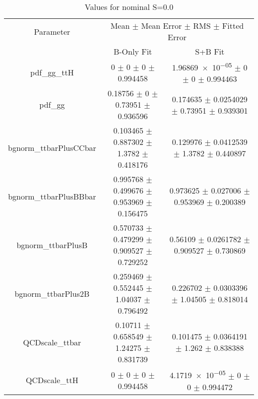 \begin{table}
\centering
\caption{Values for nominal S=0.0}
\begin{tabular}{ccc}
\toprule
Parameter & \multicolumn{2}{c}{Mean $\pm$ Mean Error $\pm$ RMS $\pm$ Fitted Error}\\
 & B-Only Fit & S+B Fit\\
\midrule
pdf\_gg\_ttH & \num{0} $\pm$ \num{0} $\pm$ \num{0} $\pm$ \num{0.994458} & \num{1.96869e-05} $\pm$ \num{0} $\pm$ \num{0} $\pm$ \num{0.994463}\\
pdf\_gg & \num{0.18756} $\pm$ \num{0} $\pm$ \num{0.73951} $\pm$ \num{0.936596} & \num{0.174635} $\pm$ \num{0.0254029} $\pm$ \num{0.73951} $\pm$ \num{0.939301}\\
bgnorm\_ttbarPlusCCbar & \num{0.103465} $\pm$ \num{0.887302} $\pm$ \num{1.3782} $\pm$ \num{0.418176} & \num{0.129976} $\pm$ \num{0.0412539} $\pm$ \num{1.3782} $\pm$ \num{0.440897}\\
bgnorm\_ttbarPlusBBbar & \num{0.995768} $\pm$ \num{0.499676} $\pm$ \num{0.953969} $\pm$ \num{0.156475} & \num{0.973625} $\pm$ \num{0.027006} $\pm$ \num{0.953969} $\pm$ \num{0.200389}\\
bgnorm\_ttbarPlusB & \num{0.570733} $\pm$ \num{0.479299} $\pm$ \num{0.909527} $\pm$ \num{0.729252} & \num{0.56109} $\pm$ \num{0.0261782} $\pm$ \num{0.909527} $\pm$ \num{0.730869}\\
bgnorm\_ttbarPlus2B & \num{0.259469} $\pm$ \num{0.552445} $\pm$ \num{1.04037} $\pm$ \num{0.796492} & \num{0.226702} $\pm$ \num{0.0303396} $\pm$ \num{1.04505} $\pm$ \num{0.818014}\\
QCDscale\_ttbar & \num{0.10711} $\pm$ \num{0.658549} $\pm$ \num{1.24275} $\pm$ \num{0.831739} & \num{0.101475} $\pm$ \num{0.0364191} $\pm$ \num{1.262} $\pm$ \num{0.838388}\\
QCDscale\_ttH & \num{0} $\pm$ \num{0} $\pm$ \num{0} $\pm$ \num{0.994458} & \num{4.1719e-05} $\pm$ \num{0} $\pm$ \num{0} $\pm$ \num{0.994472}\\
\bottomrule
\end{tabular}
\end{table}